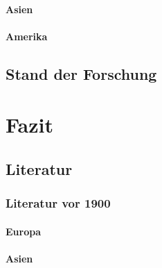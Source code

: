 \documentclass[12pt,ngerman,parskip=half]{scrreprt}
\begin{document}
\blindtext

\blindtext

\subsubsection{Asien}

\blindtext 

\blindtext

\blindtext

\subsubsection{Amerika}

\blindtext 

\blindtext

\blindtext


\section{Stand der Forschung}

\blindtext 

\blindtext

\blindtext

\chapter{Fazit}

\section{Literatur}
\subsection{Literatur vor 1900}


\subsubsection{Europa}

\blindtext 

\blindtext

\blindtext

\subsubsection{Asien}

\blindtext 

\blindtext

\blindtext
\end{document}
